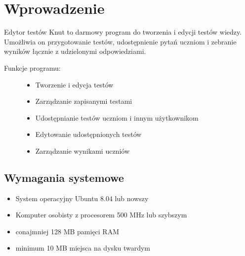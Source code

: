 \documentclass[letterpaper,10pt,polish]{sphinxmanual}
\begin{document}
\chapter{Wprowadzenie}
\label{index:wprowadzenie}\label{index:witamy-w-podreczniku-uzytkownika-edytora-testow-knut}\label{index:id1}
Edytor testów Knut to darmowy program do tworzenia i edycji testów wiedzy.
Umożliwia on przygotowanie testów, udostępnienie pytań uczniom i zebranie wyników łącznie z udzielonymi odpowiedziami.
\begin{description}
\item[{Funkcje programu:}] \leavevmode\begin{itemize}
\item {} 
Tworzenie i edycja testów

\item {} 
Zarządzanie zapisanymi testami

\item {} 
Udostępnianie testów uczniom i innym użytkownikom

\item {} 
Edytowanie udostępnionych testów

\item {} 
Zarządzanie wynikami uczniów

\end{itemize}

\end{description}


\section{Wymagania systemowe}
\label{index:wymagania-systemowe}\label{index:id2}\begin{itemize}
\item {} 
System operacyjny Ubuntu 8.04 lub nowszy

\item {} 
Komputer osobisty z procesorem 500 MHz lub szybszym

\item {} 
conajmniej 128 MB pamięci RAM

\item {} 
minimum 10 MB miejsca na dysku twardym

\end{itemize}
\end{document}
